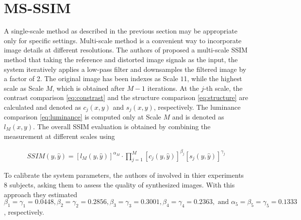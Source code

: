 \section{MS-SSIM}
\label{sec:msssim}
A single-scale method as described in the previous section may be appropriate only for speciﬁc settings. Multi-scale method is a convenient way to incorporate image details at different resolutions. The authors of \cite{wang2003multiscale} proposed a multi-scale SSIM method that taking the reference and distorted image signals as the input, the system iteratively applies a low-pass ﬁlter and downsamples the ﬁltered image by a factor of 2. The original image has been indexes as Scale $1$1, while the highest scale as Scale $M$, which is obtained after $M - 1$ iterations. At the $j$-th scale, the contrast comparison \ref{eq:constrast} and the structure comparison \ref{eq:structure} are calculated and denoted as $c_j (x, y)$ and $s_j (x, y)$, respectively. The luminance comparison \ref{eq:luminance} is computed only at Scale $M$ and is denoted as $l_M (x, y)$. The overall SSIM evaluation is obtained by combining the measurement at different scales using

\begin{align}
SSIM(y, \hat{y}) = [l_M(y, \hat{y})]^{\alpha_M} \cdot \prod^{M}_{j = 1} [c_j(y, \hat{y})]^{\beta_j} [s_j(y, \hat{y})]^{\gamma_j}
\end{align}

To calibrate the system parameters, the authors of \cite{wang2003multiscale} involved in thier experiments 8 subjects, asking them to assess the quality of synthesized images. With this approach they estimated $\beta_1 = \gamma_1 = 0.0448, \beta_2 = \gamma_2 = 0.2856, \beta_3 = \gamma_3= 0.3001, \beta_4 = \gamma_4 = 0.2363, \text{ and } \alpha_5 = \beta_5 = \gamma_5 = 0.1333$, respectively.
